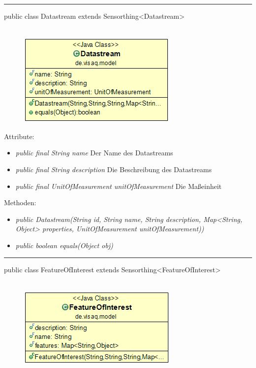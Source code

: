 \rule{\textwidth}{0.4pt}
public class Datastream extends Sensorthing<Datastream>
\\\\
\begin{minipage}{0.3\textwidth}
	\begin{figure}[H]
		\includegraphics[scale = 0.5
		]{media/frontend/model/DatastreamClass.png}
	\end{figure}
\end{minipage} \hfill
\begin{minipage}{0.6\textwidth}
\end{minipage}

Attribute:
\begin{itemize} 
	\item \emph{public final String name} Der Name des Datastreams
	\item \emph{public final String description} Die Beschreibung des Datastreams
	\item \emph{public final UnitOfMeasurement unitOfMeasurement} Die Maßeinheit
\end{itemize}
Methoden:
\begin{itemize} 
	\item \emph{public Datastream(String id, String name, String description, Map<String, Object> properties, UnitOfMeasurement unitOfMeasurement))} 
	\item \emph{public boolean equals(Object obj)} 
\end{itemize}

\rule{\textwidth}{0.4pt}
public class FeatureOfInterest extends Sensorthing<FeatureOfInterest>
\\\\
\begin{minipage}{0.3\textwidth}
	\begin{figure}[H]
		\includegraphics[scale = 0.5
		]{media/frontend/model/FeatureOfInterestClass.png}
	\end{figure}
\end{minipage} \hfill
\begin{minipage}{0.6\textwidth}
\end{minipage}

